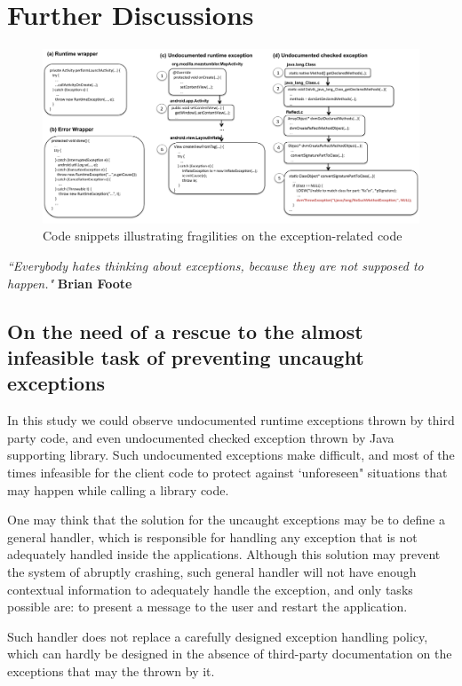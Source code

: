 \documentclass[conference]{IEEEtran}
\begin{document}
\section{Further Discussions}
\label{sec:disc}

\begin{figure} \centering \includegraphics[scale=0.55]{codeexamples.pdf}
\caption{Code snippets illustrating fragilities on the exception-related code} \label{fig:snippets} \end{figure}


\emph{``Everybody hates thinking about exceptions, because they are not supposed to happen."}
\textbf{Brian Foote} 

\subsection{On the need of a rescue to the almost infeasible task of preventing uncaught exceptions}
In this study we could observe undocumented runtime exceptions thrown by third party code,
and even undocumented checked exception thrown by Java supporting library.
Such undocumented exceptions make difficult, and most of the times infeasible
for the client code to protect against `unforeseen" situations that may happen 
while calling a library code.

One may think that the solution for the uncaught exceptions 
may be to define a general handler, 
which is responsible for handling any exception that is not
adequately handled inside the applications. Although this 
solution may prevent  the system of abruptly crashing,
 such general handler will not have enough
contextual information to adequately handle the exception, 
and only tasks possible are: to present a message to the user
 and restart the application.

Such handler does not replace a carefully designed exception 
handling policy, which can hardly be designed in the absence of 
third-party documentation on the exceptions that
may the thrown by it.
\end{document}
